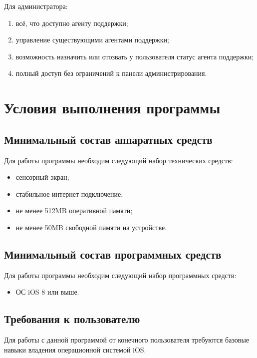 \documentclass{../includes/TechDoc}
\begin{document}
    Для администратора:
    \begin{enumerate}[noitemsep]
        \item всё, что доступно агенту поддержки;
        \item управление существующими агентами поддержки;
        \item возможность назначить или отозвать у пользователя статус агента поддержки;
        \item полный доступ без ограничений к панели администрирования.
    \end{enumerate}


    \section{Условия выполнения программы}

    \subsection{Минимальный состав аппаратных средств}

    Для работы программы необходим следующий набор технических средств:
    \begin{itemize}
        \item сенсорный экран;
        \item стабильное интернет-подключение;
        \item не менее 512MB оперативной памяти;
        \item не менее 50MB свободной памяти на устройстве.
    \end{itemize}

    \subsection{Минимальный состав программных средств}

    Для работы программы необходим следующий набор программных средств:
    \begin{itemize}
        \item ОС iOS 8 или выше.
    \end{itemize}

    \subsection{Требования к пользователю}

    Для работы с данной программой от конечного пользователя требуются базовые навыки владения
    операционной системой iOS\@.
\end{document}
